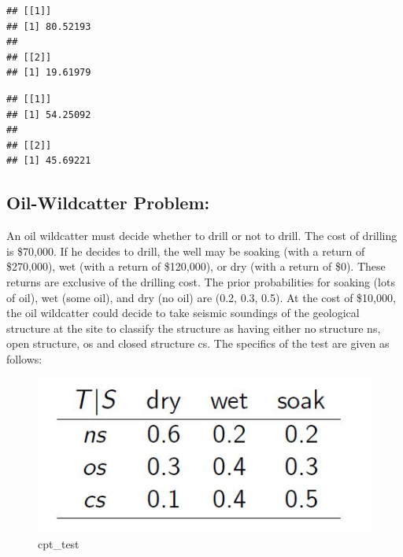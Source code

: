 \documentclass[
]{article}
\newenvironment{Shaded}{\begin{snugshade}}{\end{snugshade}}
\newcommand{\ControlFlowTok}[1]{\textcolor[rgb]{0.13,0.29,0.53}{\textbf{#1}}}
\newcommand{\FunctionTok}[1]{\textcolor[rgb]{0.00,0.00,0.00}{#1}}
\newcommand{\NormalTok}[1]{#1}
\newcommand{\SpecialCharTok}[1]{\textcolor[rgb]{0.00,0.00,0.00}{#1}}
\newcommand{\StringTok}[1]{\textcolor[rgb]{0.31,0.60,0.02}{#1}}
\begin{document}
\begin{Shaded}
\end{Shaded}

\begin{verbatim}
## [[1]]
## [1] 80.52193
## 
## [[2]]
## [1] 19.61979
\end{verbatim}

\begin{Shaded}
\end{Shaded}

\begin{verbatim}
## [[1]]
## [1] 54.25092
## 
## [[2]]
## [1] 45.69221
\end{verbatim}

\hypertarget{oil-wildcatter-problem}{%
\subsection{Oil-Wildcatter Problem:}\label{oil-wildcatter-problem}}

An oil wildcatter must decide whether to drill or not to drill. The cost of drilling is \$70,000. If he decides to drill, the well may be soaking (with a return of \$270,000), wet (with a return of \$120,000), or dry (with a return of \$0). These returns are exclusive of the drilling cost. The prior probabilities for soaking (lots of oil), wet (some oil), and dry (no oil) are (0.2, 0.3, 0.5). At the cost of \$10,000, the oil wildcatter could decide to take seismic soundings of the geological structure at the site to classify the structure as having either no structure ns, open structure, os and closed structure cs. The specifics of the test are given as follows:

\begin{figure}
\centering
\includegraphics{data/cpt_test_soaking.JPG}
\caption{cpt\_test}
\end{figure}
\end{document}
